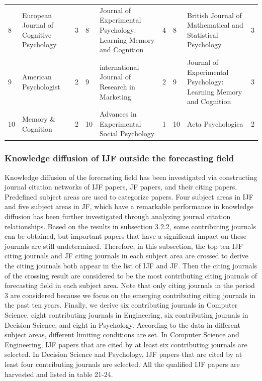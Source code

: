 \documentclass[11pt,a4paper]{elsarticle} %
\begin{document}
\begin{landscape}
\begin{table}[!htbp]
{\begin{tabular}{p{1.5cm}<{\centering} p{6cm}<{\centering} p{1.5cm}<{\centering}|p{1.5cm}<{\centering} p{6cm}<{\centering} p{1.5cm}<{\centering}|p{1.5cm}<{\centering} p{6cm}<{\centering} p{1.5cm}<{\centering}}
8 & European Journal of Cognitive Psychology & 3 & 8 & Journal of Experimental Psychology: Learning Memory and Cognition & 4 & 8 & British Journal of Mathematical and Statistical Psychology & 3\\
9 & American Psychologist & 2 & 9 & international Journal of Research in Marketing & 2 & 9 & Journal of Experimental Psychology: Learning Memory and Cognition & 3\\
10 & Memory \& Cognition & 2 & 10 & Advances in Experimental Social Psychology & 1 & 10 & Acta Psychologica & 2\\
  \hline
  \hline
    \end{tabular}}
\end{table}
\end{landscape}

\subsubsection{Knowledge diffusion of IJF outside the forecasting
field}\label{knowledge-diffusion-of-ijf-outside-the-forecasting-field}

Knowledge diffusion of the forecasting field has been investigated via
constructing journal citation networks of IJF papers, JF papers, and
their citing papers. Predefined subject areas are used to categorize
papers. Four subject areas in IJF and five subject areas in JF, which
have a remarkable performance in knowledge diffusion has been further
investigated through analyzing journal citation relationships. Based on
the results in subsection 3.2.2, some contributing journals can be
obtained, but important papers that have a significant impact on these
journals are still undetermined. Therefore, in this subsection, the top
ten IJF citing journals and JF citing journals in each subject area are
crossed to derive the citing journals both appear in the list of IJF and
JF. Then the citing journals of the crossing result are considered to be
the most contributing citing journals of forecasting field in each
subject area. Note that only citing journals in the period 3 are
considered because we focus on the emerging contributing citing journals
in the past ten years. Finally, we derive six contributing journals in
Computer Science, eight contributing journals in Engineering, six
contributing journals in Decision Science, and eight in Psychology.
According to the data in different subject areas, different limiting
conditions are set. In Computer Science and Engineering, IJF papers that
are cited by at least six contributing journals are selected. In
Decision Science and Psychology, IJF papers that are cited by at least
four contributing journals are selected. All the qualified IJF papers
are harvested and listed in table 21-24.
\end{document}
